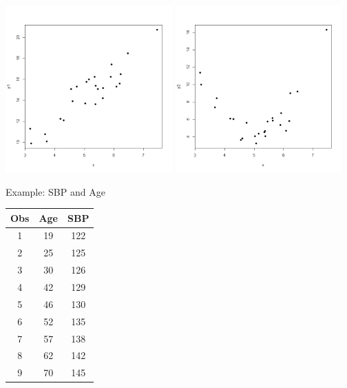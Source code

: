 \documentclass[handout,x11names,unknownkeysallowed]{beamer}
\begin{document}
\begin{frame}
\centering
\includegraphics[width=0.48\textwidth]{linear.png}
\includegraphics[width=0.48\textwidth]{parabolic.png}
\end{frame}

\begin{frame}

{ \begin{center} 
Example: SBP and Age
\end{center}}
\vspace{.1in}
\begin{center}
\begin{tabular}{ccc}
Obs	&Age	&SBP\\
\hline	
1	&19	&122	\\
2	&25	&125	\\
3	&30	&126	\\
4	&42	&129	\\
5	&46	&130	\\
6	&52	&135	\\
7	&57	&138	\\
8	&62	&142	\\
9	&70	&145\\
\end{tabular}
\end{center}
\end{frame}
\end{document}
